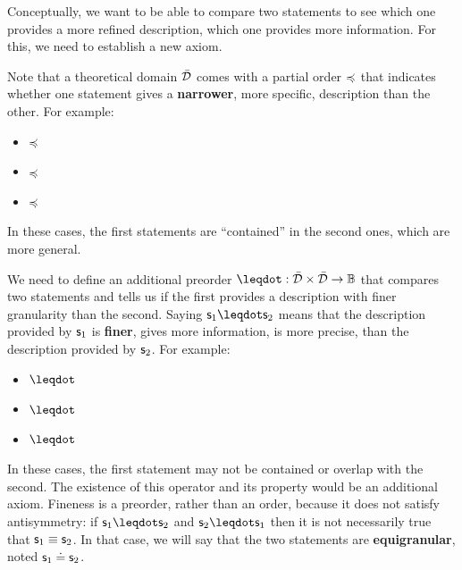 \documentclass[11pt,letterpaper,fleqn]{memoir} %
\begin{document}
Conceptually, we want to be able to compare two statements to see which one provides a more refined description, which one provides more information. For this, we need to establish a new axiom.

Note that a theoretical domain $\bar{\mathcal{D}}$ comes with a partial order $\preccurlyeq$ that indicates whether one statement gives a \textbf{narrower}, more specific, description than the other. For example:
\begin{itemize}
	\item {} $\preccurlyeq$ 
	\item {} $\preccurlyeq$ 
	\item {} $\preccurlyeq$ 
\end{itemize}
In these cases, the first statements are ``contained'' in the second ones, which are more general.

We need to define an additional preorder $\finer : \tdomain \times \tdomain \to \mathbb{B}$ that compares two statements and tells us if the first provides a description with finer granularity than the second. Saying $\stmt_1 \finer \stmt_2$ means that the description provided by $\mathsf{s}_1$ is \textbf{finer}, gives more information, is more precise, than the description provided by $\mathsf{s}_2$. For example:
\begin{itemize}
	\item {} $\finer$ 
	\item {} $\finer$ 
	\item {} $\finer$ 
\end{itemize}
In these cases, the first statement may not be contained or overlap with the second. The existence of this operator and its property would be an additional axiom. Fineness is a preorder, rather than an order, because it does not satisfy antisymmetry: if $\stmt_1 \finer \stmt_2$ and $\stmt_2 \finer \stmt_1$ then it is not necessarily true that $\mathsf{s}_1 \equiv \mathsf{s}_2$. In that case, we will say that the two statements are \textbf{equigranular}, noted $\mathsf{s}_1 \doteq \mathsf{s}_2$.
\end{document}
